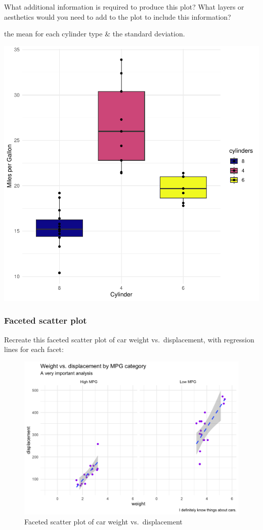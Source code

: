 \documentclass[
  man,
  floatsintext,
  longtable,
  nolmodern,
  notxfonts,
  notimes,
  colorlinks=true,linkcolor=blue,citecolor=blue,urlcolor=blue]{apa7}
\begin{document}
What additional information is required to produce this plot? What
layers or aesthetics would you need to add to the plot to include this
information?

the mean for each cylinder type \& the standard deviation.

\includegraphics{data-visualization_files/figure-pdf/Boxplot-1.pdf}

\subsubsection{Faceted scatter plot}\label{faceted-scatter-plot}

Recreate this faceted scatter plot of car weight vs.~displacement, with
regression lines for each facet:

\begin{figure}[H]

\caption{Faceted scatter plot of car weight vs.~displacement}

{\centering \includegraphics{plots/plot5.png}

}

\end{figure}%
\end{document}
